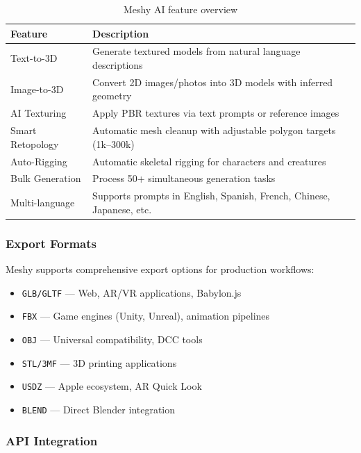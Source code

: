 \documentclass[11pt]{article}
\newcommand{\fileformat}[1]{\texttt{#1}}
\begin{document}
\begin{table}[H]
\centering
\small
\begin{tabularx}{\textwidth}{@{}l X@{}}
\toprule
\textbf{Feature} & \textbf{Description} \\
\midrule
Text-to-3D & Generate textured models from natural language descriptions \\
Image-to-3D & Convert 2D images/photos into 3D models with inferred geometry \\
AI Texturing & Apply PBR textures via text prompts or reference images \\
Smart Retopology & Automatic mesh cleanup with adjustable polygon targets (1k--300k) \\
Auto-Rigging & Automatic skeletal rigging for characters and creatures \\
Bulk Generation & Process 50+ simultaneous generation tasks \\
Multi-language & Supports prompts in English, Spanish, French, Chinese, Japanese, etc. \\
\bottomrule
\end{tabularx}
\caption{Meshy AI feature overview}
\label{tab:meshy-features}
\end{table}

\subsubsection{Export Formats}

Meshy supports comprehensive export options for production workflows:

\begin{itemize}[leftmargin=2em]
  \item \fileformat{GLB/GLTF} --- Web, AR/VR applications, Babylon.js
  \item \fileformat{FBX} --- Game engines (Unity, Unreal), animation pipelines
  \item \fileformat{OBJ} --- Universal compatibility, DCC tools
  \item \fileformat{STL/3MF} --- 3D printing applications
  \item \fileformat{USDZ} --- Apple ecosystem, AR Quick Look
  \item \fileformat{BLEND} --- Direct Blender integration
\end{itemize}

\subsubsection{API Integration}
\end{document}
